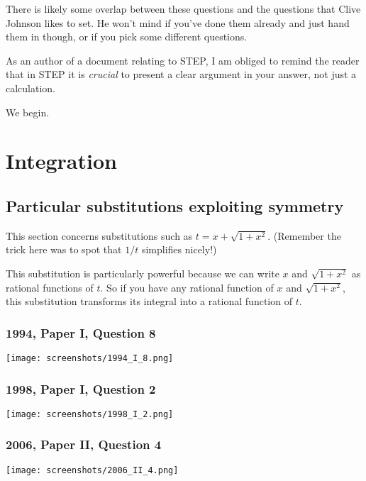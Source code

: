 \documentclass[a4paper,12pt]{article}
\begin{document}
There is likely some overlap between these questions and the questions that
Clive Johnson likes to set. He won't mind if you've done them already and just
hand them in though, or if you pick some different questions.

As an author of a document relating to STEP, I am obliged to remind the reader
that in STEP it is \emph{crucial} to present a clear argument in your answer,
not just a calculation.

We begin.

\section{Integration}

\subsection{Particular substitutions exploiting symmetry}

This section concerns substitutions such as \(t = x + \sqrt{1 + x^2}\).
(Remember the trick here was to spot that \(1/t\) simplifies nicely!)

This substitution is particularly powerful because we can write \(x\) and
\(\sqrt{1 + x^2}\) as rational functions of \(t\). So if you have any rational
function of \(x\) and \(\sqrt{1 + x^2}\), this substitution transforms its
integral into a rational function of \(t\).

\subsubsection{1994, Paper I, Question 8}
\begin{center}
 \texttt{[image: screenshots/1994\_I\_8.png]}
\end{center}

\subsubsection{1998, Paper I, Question 2}
\begin{center}
 \texttt{[image: screenshots/1998\_I\_2.png]}
\end{center}

\subsubsection{2006, Paper II, Question 4}
\begin{center}
 \texttt{[image: screenshots/2006\_II\_4.png]}
\end{center}
\end{document}
